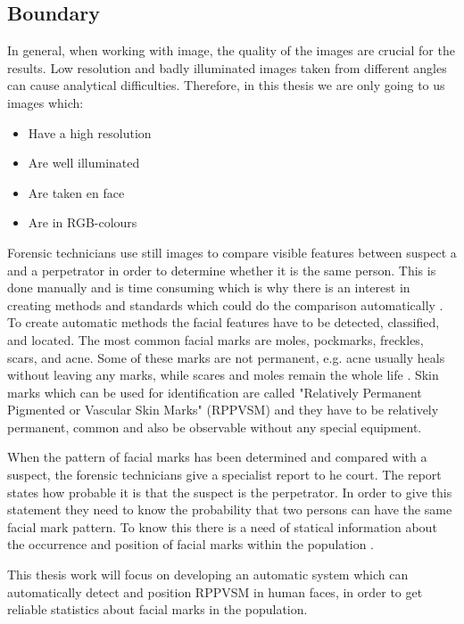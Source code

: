 \subsection{Boundary}

In general, when working with image, the quality of the images are crucial for the results. Low resolution and badly illuminated images taken from different angles can cause analytical difficulties. Therefore, in this thesis we are only going to us images which:

\begin{itemize}
	\item Have a high resolution
	\item Are well illuminated
	\item Are taken en face
	\item Are in RGB-colours 
\end{itemize}




Forensic technicians use still images to compare visible features between suspect a and a perpetrator in order to determine whether it is the same person. This is done manually and is time consuming which is why there is an interest in creating methods and standards which could do the comparison automatically \cite{forensic_identification}. To create automatic methods the facial features have to be detected, classified, and located. The most common facial marks are moles, pockmarks, freckles, scars, and acne. Some of these marks are not permanent, e.g. acne usually heals without leaving any marks, while scares and moles remain the whole life    \cite{automatic_detector_2015}. Skin marks which can be used for identification are called "Relatively Permanent Pigmented or Vascular Skin Marks" (RPPVSM) and they have to be relatively permanent, common and also be observable without any special equipment. \cite{statistic_RPPVSM}

When the pattern of facial marks has been determined and compared with a suspect, the forensic technicians give a specialist report to he court. The report states how probable it is that the suspect is the perpetrator. In order to give this statement they need to know the probability that two persons can have the same facial mark pattern. To know this there is a need of statical information about the occurrence and position of facial marks within the population \cite{NFC_stat}.

This thesis work will focus on developing an automatic system which can automatically detect and position RPPVSM in human faces, in order to get reliable statistics about facial marks in the population.   
